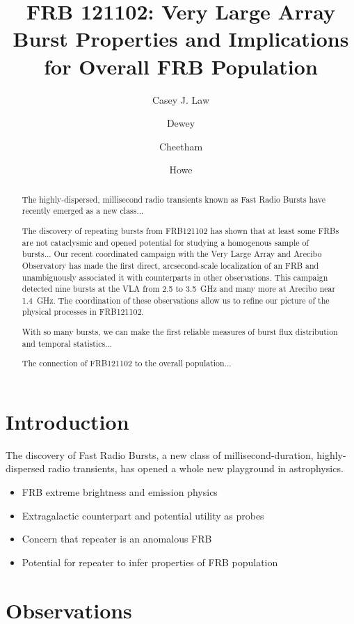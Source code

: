 \documentclass{emulateapj}
\begin{document}
\title{FRB 121102: Very Large Array Burst Properties and Implications for Overall FRB Population}

\author{Casey J. Law}
\author{Dewey}
\author{Cheetham}
\author{Howe}

\begin{abstract}
The highly-dispersed, millisecond radio transients known as Fast Radio Bursts have recently emerged as a new class...

The discovery of repeating bursts from FRB121102 has shown that at least some FRBs are not cataclysmic and opened potential for studying a homogenous sample of bursts...
Our recent coordinated campaign with the Very Large Array and Arecibo Observatory has made the first direct, arcsecond-scale localization of an FRB and unambiguously associated it with counterparts in other observations. This campaign detected nine bursts at the VLA from 2.5 to 3.5~GHz and many more at Arecibo near 1.4~GHz. The coordination of these observations allow us to refine our picture of the physical processes in FRB121102. 

With so many bursts, we can make the first reliable measures of burst flux distribution and temporal statistics...

The connection of FRB121102 to the overall population...

\end{abstract}

\section{Introduction}
The discovery of Fast Radio Bursts, a new class of millisecond-duration, highly-dispersed radio transients, has opened a whole new playground in astrophysics. 

\begin{itemize}
 \item FRB extreme brightness and emission physics
 \item Extragalactic counterpart and potential utility as probes
 \item Concern that repeater is an anomalous FRB
 \item Potential for repeater to infer properties of FRB population
\end{itemize}

\section{Observations}
\end{document}
